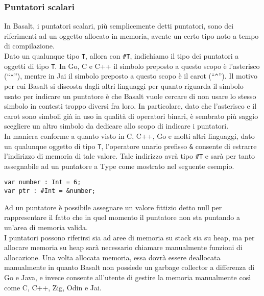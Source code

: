 \subsubsection{Puntatori scalari}
In Basalt, i puntatori scalari, più semplicemente detti puntatori, sono dei riferimenti ad un oggetto allocato in memoria, 
avente un certo tipo noto a tempo di compilazione. \\

Dato un qualunque tipo \texttt{T}, allora con \texttt{\#T}, indichiamo il tipo dei puntatori a oggetti di tipo \texttt{T}. In Go, C e C++ il simbolo preposto a 
questo scopo è l’asterisco (“\texttt{*}”), mentre in Jai il simbolo preposto a questo scopo è il carot (“\texttt{\^}”). Il motivo per cui 
Basalt si discosta dagli altri linguaggi per quanto riguarda il simbolo usato per indicare un puntatore è che Basalt vuole cercare di non usare lo stesso 
simbolo in contesti troppo diversi fra loro. In particolare, dato che l’asterisco e il carot sono simboli già in uso in qualità di operatori binari, 
è sembrato più saggio scegliere un altro simbolo da dedicare allo scopo di indicare i puntatori. \\  

In maniera conforme a quanto visto in C, C++, Go e molti altri linguaggi, dato un qualunque oggetto di tipo \texttt{T}, l’operatore unario prefisso \texttt{\&} 
consente di estrarre l’indirizzo di memoria di tale valore. Tale indirizzo avrà tipo \texttt{\#T} e sarà per tanto assegnabile ad un puntatore 
a Type come mostrato nel seguente esempio. \\

\vspace{0.5cm}
\begin{lstlisting}[frame=single]
var number : Int = 6;
var ptr : #Int = &number;
\end{lstlisting}
\vspace{0.5cm}

Ad un puntatore è possibile assegnare un valore fittizio detto null per rappresentare il fatto che in quel momento il puntatore non sta puntando a 
un’area di memoria valida. \\

I puntatori possono riferirsi sia ad aree di memoria su stack sia su heap, ma per allocare memoria su 
heap sarà necessario chiamare manualmente funzioni di allocazione. Una volta allocata memoria, essa dovrà essere 
deallocata manualmente in quanto Basalt non possiede un garbage collector a differenza di Go e Java, e invece consente 
all’utente di gestire la memoria manualmente così come C, C++, Zig, Odin e Jai. \\

